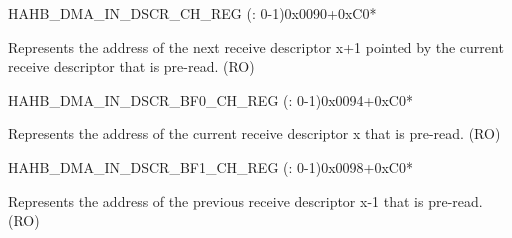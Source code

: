 \begin{register}{H}{AHB\_DMA\_IN\_DSCR\_CH\_REG (: 0-1)}{0x0090+0xC0*}\label{regdesc:AHBDMAINDSCRCHNREG}
%
\regnewline%
\begin{regdesc}\begin{reglist}
\label{fielddesc:AHBDMAINLINKDSCRCHN}\item [AHB\_DMA\_INLINK\_DSCR\_CH\regindex{n}] Represents the address of the next receive descriptor x+1 pointed by the current receive descriptor that is pre-read. (RO)
\end{reglist}\end{regdesc}
\end{register}


\begin{register}{H}{AHB\_DMA\_IN\_DSCR\_BF0\_CH\_REG (: 0-1)}{0x0094+0xC0*}\label{regdesc:AHBDMAINDSCRBF0CHNREG}
%
\regnewline%
\begin{regdesc}\begin{reglist}
\label{fielddesc:AHBDMAINLINKDSCRBF0CHN}\item [AHB\_DMA\_INLINK\_DSCR\_BF0\_CH\regindex{n}] Represents the address of the current receive descriptor x that is pre-read. (RO)
\end{reglist}\end{regdesc}
\end{register}


\begin{register}{H}{AHB\_DMA\_IN\_DSCR\_BF1\_CH\_REG (: 0-1)}{0x0098+0xC0*}\label{regdesc:AHBDMAINDSCRBF1CHNREG}
%
\regnewline%
\begin{regdesc}\begin{reglist}
\label{fielddesc:AHBDMAINLINKDSCRBF1CHN}\item [AHB\_DMA\_INLINK\_DSCR\_BF1\_CH\regindex{n}] Represents the address of the previous receive descriptor x-1 that is pre-read. (RO)
\end{reglist}\end{regdesc}
\end{register}


